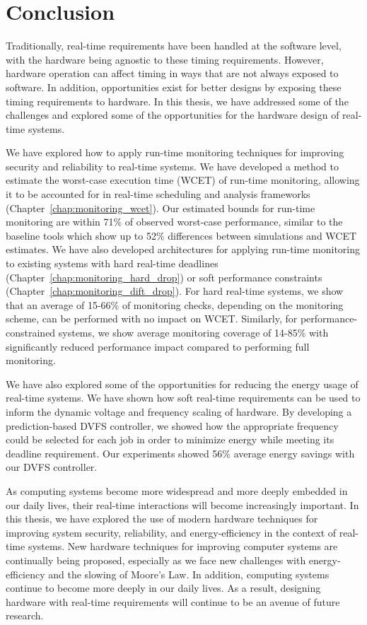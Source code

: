 \chapter{Conclusion}
\label{chap:conclusion}

Traditionally, real-time requirements have been handled at the software level,
with the hardware being agnostic to these timing requirements. However,
hardware operation can affect timing in ways that are not always exposed to
software. In addition, opportunities exist for better designs by exposing these
timing requirements to hardware. In this thesis, we have addressed some of the
challenges and explored some of the opportunities for the hardware design of
real-time systems.

We have explored how to apply run-time monitoring techniques for improving
security and reliability to real-time systems. We have developed a method
to estimate the worst-case execution time (WCET) of run-time monitoring,
allowing it to be accounted for in real-time scheduling and analysis frameworks
(Chapter~\ref{chap:monitoring_wcet}). Our estimated bounds for run-time
monitoring are within 71\% of observed worst-case performance, similar to the
baseline tools which show up to 52\% differences between simulations and WCET
estimates. We have also developed architectures for applying run-time
monitoring to existing systems with hard real-time deadlines
(Chapter~\ref{chap:monitoring_hard_drop}) or soft performance constraints
(Chapter~\ref{chap:monitoring_dift_drop}). For hard real-time systems, we show
that an average of 15-66\% of monitoring checks, depending on the monitoring
scheme, can be performed with no impact on WCET. Similarly, for
performance-constrained systems, we show average monitoring coverage of 14-85\%
with significantly reduced performance impact compared to performing full
monitoring.

We have also explored some of the opportunities for reducing the energy usage
of real-time systems. We have shown how soft real-time requirements can be used
to inform the dynamic voltage and frequency scaling of hardware. By developing
a prediction-based DVFS controller, we showed how the appropriate frequency
could be selected for each job in order to minimize energy while meeting its
deadline requirement.  Our experiments showed 56\% average energy savings with
our DVFS controller.

As computing systems become more widespread and more deeply embedded in our
daily lives, their real-time interactions will become increasingly important.
In this thesis, we have explored the use of modern hardware techniques for
improving system security, reliability, and energy-efficiency in the context of
real-time systems. New hardware techniques for improving computer systems are
continually being proposed, especially as we face new challenges with
energy-efficiency and the slowing of Moore's Law. In addition, computing
systems continue to become more deeply in our daily lives. As a result,
designing hardware with real-time requirements will continue to be an avenue of
future research.

